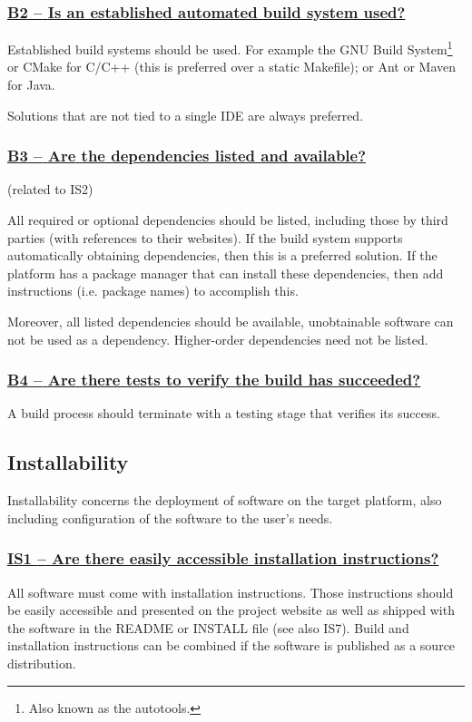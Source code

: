 \documentclass[a4paper,11pt]{article}
\newcommand{\criterion}[1]{\subsubsection*{\underline{#1}}}
\begin{document}
\newcommand{\bTwoID}{B2}
\newcommand{\bTwoText}{Is an established automated build system used?}
\criterion{\bTwoID{ }--{ }\bTwoText}\label{id:b2} 

Established build systems should be used. For example the GNU Build
System\footnote{Also known as the autotools.} or CMake for C/C++ (this is
preferred over a static Makefile); or Ant or Maven for Java. 

Solutions that are not tied to a single IDE are always preferred.

\newcommand{\bThreeID}{B3}
\newcommand{\bThreeText}{Are the dependencies listed and available?}
\criterion{\bThreeID{ }--{ }\bThreeText}\label{id:b3}
(related to IS2)

All required or optional dependencies should be listed, including those by
third parties (with references to their websites). If the build system supports
automatically obtaining dependencies, then this is a preferred solution. If the
platform has a package manager that can install these dependencies, then add
instructions (i.e. package names) to accomplish this.

Moreover, all listed dependencies should be available, unobtainable software
can not be used as a dependency. Higher-order dependencies need not be listed.

\newcommand{\bFourID}{B4}
\newcommand{\bFourText}{Are there tests to verify the build has succeeded?}
\criterion{\bFourID{ }--{ }\bFourText}\label{id:b4} 

A build process should terminate with a testing stage that verifies its success.

\subsection{Installability}\label{sec:ins}

Installability concerns the deployment of software on the target platform, also
including configuration of the software to the user's needs.

\newcommand{\isOneID}{IS1}
\newcommand{\isOneText}{Are there easily accessible installation instructions?}
\criterion{\isOneID{ }--{ }\isOneText}\label{id:is1} 

All software must come with installation instructions. Those instructions should
be easily accessible and presented on the project website as well as shipped
with the software in the README or INSTALL file (see also IS7). Build and installation
instructions can be combined if the software is published as a source
distribution.
\end{document}
